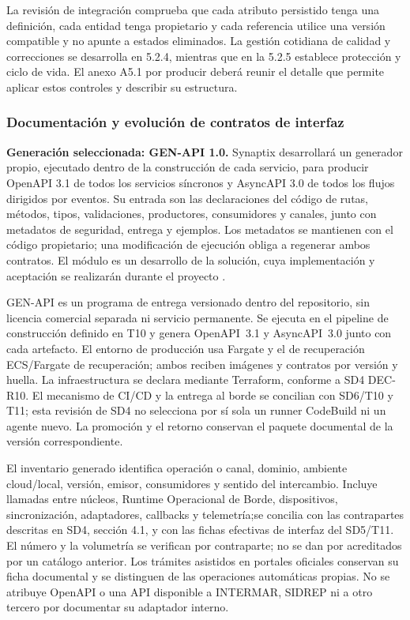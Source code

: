 La revisión de integración comprueba que cada atributo persistido tenga una definición, cada entidad tenga propietario y cada referencia utilice una versión compatible y no apunte a estados eliminados. La gestión cotidiana de calidad y correcciones se desarrolla en 5.2.4, mientras que en la 5.2.5 establece protección y ciclo de vida. El anexo A5.1 por producir deberá reunir el detalle que permite aplicar estos controles y describir su estructura.

\subsubsection{Documentación y evolución de contratos de interfaz}
\label{subsec:sd5_contratos_lote05}

\textbf{Generación seleccionada: GEN-API 1.0.} Synaptix desarrollará un generador propio, ejecutado dentro de la construcción de cada servicio, para producir OpenAPI 3.1 de todos los servicios síncronos y AsyncAPI 3.0 de todos los flujos dirigidos por eventos. Su entrada son las declaraciones del código de rutas, métodos, tipos, validaciones, productores, consumidores y canales, junto con metadatos de seguridad, entrega y ejemplos. Los metadatos se mantienen con el código propietario; una modificación de ejecución obliga a regenerar ambos contratos. El módulo es un desarrollo de la solución, cuya implementación y aceptación se realizarán durante el proyecto \parencite[RT-05.16, p.~12]{bases-transversales}.

GEN-API es un programa de entrega versionado dentro del repositorio, sin licencia comercial separada ni servicio permanente. Se ejecuta en el pipeline de construcción definido en T10 y genera OpenAPI~3.1 y AsyncAPI~3.0 junto con cada artefacto. El entorno de producción usa Fargate y el de recuperación ECS/Fargate de recuperación; ambos reciben imágenes y contratos por versión y huella. La infraestructura se declara mediante Terraform, conforme a SD4 DEC-R10. El mecanismo de CI/CD y la entrega al borde se concilian con SD6/T10 y T11; esta revisión de SD4 no selecciona por sí sola un runner CodeBuild ni un agente nuevo. La promoción y el retorno conservan el paquete documental de la versión correspondiente.

El inventario generado identifica operación o canal, dominio, ambiente cloud/local, versión, emisor, consumidores y sentido del intercambio. Incluye llamadas entre núcleos, Runtime Operacional de Borde, dispositivos, sincronización, adaptadores, callbacks y telemetría;se concilia con las contrapartes descritas en SD4, sección 4.1, y con las fichas efectivas de interfaz del SD5/T11. El número y la volumetría se verifican por contraparte; no se dan por acreditados por un catálogo anterior. Los trámites asistidos en portales oficiales conservan su ficha documental y se distinguen de las operaciones automáticas propias. No se atribuye OpenAPI o una API disponible a INTERMAR, SIDREP ni a otro tercero por documentar su adaptador interno.


